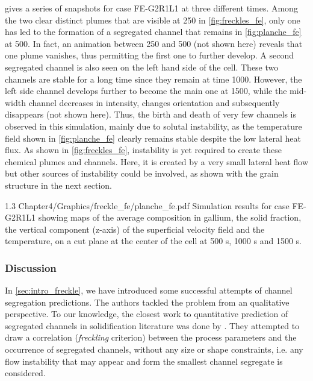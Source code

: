  gives a series of snapshots for case FE-G2R1L1 at three different times. Among the two clear distinct 
plumes that are visible at \SI{250}{\utime} in \cref{fig:freckles_fe}, only one has led to the formation of a segregated channel
that remains in \cref{fig:planche_fe} at \SI{500}{\utime}. 
In fact, an animation between \SI{250}{\utime} and \SI{500}{\utime} (not shown here) reveals that one plume vanishes, 
thus permitting the first one to further develop. A second segregated channel is also seen on the left hand side of the cell. 
These two channels are stable for a long time since they remain at time \SI{1000}{\utime}. However, the left side channel 
develops further to become the main one at \SI{1500}{\utime}, while the mid-width channel decreases in intensity, changes 
orientation and subsequently disappears (not shown here). Thus, the birth and death of very few channels is observed in this 
simulation, mainly due to solutal instability, as the temperature field shown in \cref{fig:planche_fe} clearly remains stable despite 
the low lateral heat flux. As shown in \cref{fig:freckles_fe}, instability is yet required to create these chemical plumes and channels. 
Here, it is created by a very small lateral heat flow but other sources of instability could be involved, as shown with the grain structure in the next section.

\begin{landscape}
\begin{figureth}
{1.3}
{Chapter4/Graphics/freckle_fe/planche_fe.pdf}
{Simulation results for case FE-G2R1L1 showing maps of the average composition in gallium,
the solid fraction, the vertical component (z-axis) of the superficial velocity field and the temperature, 
on a cut plane at the center of the cell at 500 s, 1000 s and 1500 s.}
\label{fig:planche_fe}
\end{figureth}
\end{landscape}


\subsubsection{Discussion}

In \cref{sec:intro_freckle}, we have introduced some successful attempts of channel segregation predictions. 
The authors tackled the problem from an qualitative perspective. 
To our knowledge, the closest work to quantitative prediction of segregated channels in solidification literature was done by \citet{ramirez_evaluation_2003}.
They attempted to draw a correlation (\emph{freckling} criterion) between the process parameters and the occurrence of segregated channels, 
without any size or shape constraints, i.e. any flow instability that may appear and form the smallest channel segregate is considered. 

